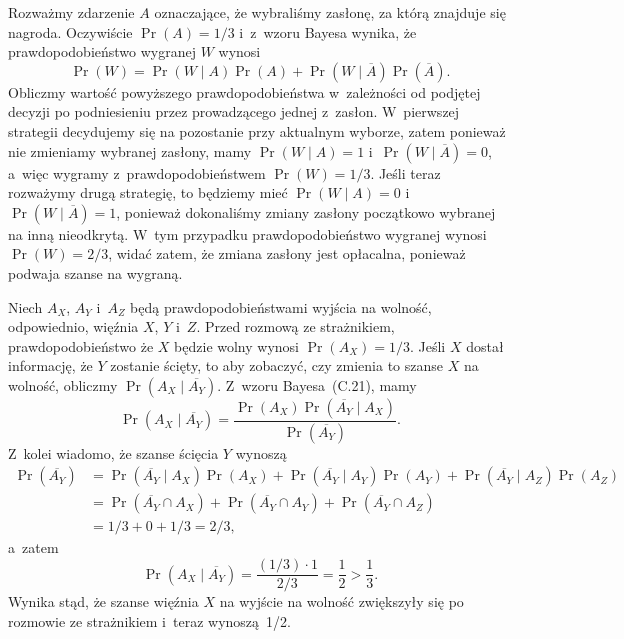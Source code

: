 \exercise{} %
Rozważmy zdarzenie $A$ oznaczające, że wybraliśmy zasłonę, za którą znajduje się nagroda. Oczywiście $\Pr(A)=1/3$ i~z~wzoru Bayesa wynika, że prawdopodobieństwo wygranej $W$ wynosi
\[
	\Pr(W) = \Pr(W\mid A)\Pr(A)+\Pr(W\mid\overline{A})\Pr(\overline{A}).
\]
Obliczmy wartość powyższego prawdopodobieństwa w~zależności od podjętej decyzji po podniesieniu przez prowadzącego jednej z~zasłon. W~pierwszej strategii decydujemy się na pozostanie przy aktualnym wyborze, zatem ponieważ nie zmieniamy wybranej zasłony, mamy $\Pr(W\mid A)=1$ i~$\Pr(W\mid\overline{A})=0$, a~więc wygramy z~prawdopodobieństwem $\Pr(W)=1/3$. Jeśli teraz rozważymy drugą strategię, to będziemy mieć $\Pr(W\mid A)=0$ i~$\Pr(W\mid\overline{A})=1$, ponieważ dokonaliśmy zmiany zasłony początkowo wybranej na inną nieodkrytą. W~tym przypadku prawdopodobieństwo wygranej wynosi $\Pr(W)=2/3$, widać zatem, że zmiana zasłony jest opłacalna, ponieważ podwaja szanse na wygraną.

\exercise{} %
Niech $A_X$, $A_Y$ i~$A_Z$ będą prawdopodobieństwami wyjścia na wolność, odpowiednio, więźnia $X$, $Y$ i~$Z$. Przed rozmową ze strażnikiem, prawdopodobieństwo że $X$ będzie wolny wynosi $\Pr(A_X)=1/3$. Jeśli $X$ dostał informację, że $Y$ zostanie ścięty, to aby zobaczyć, czy zmienia to szanse $X$ na wolność, obliczmy $\Pr(A_X\mid\overline{A_Y})$. Z~wzoru Bayesa~(C.21), mamy
\[
	\Pr(A_X\mid\overline{A_Y}) = \frac{\Pr(A_X)\Pr(\overline{A_Y}\mid A_X)}{\Pr(\overline{A_Y})}.
\]
Z~kolei wiadomo, że szanse ścięcia $Y$ wynoszą
\begin{align*}
	\Pr(\overline{A_Y}) &= \Pr(\overline{A_Y}\mid A_X)\Pr(A_X)+\Pr(\overline{A_Y}\mid A_Y)\Pr(A_Y)+\Pr(\overline{A_Y}\mid A_Z)\Pr(A_Z) \\
	&= \Pr(\overline{A_Y}\cap A_X)+\Pr(\overline{A_Y}\cap A_Y)+\Pr(\overline{A_Y}\cap A_Z) \\
	&= 1/3+0+1/3 = 2/3,
\end{align*}
a~zatem
\[
	\Pr(A_X\mid\overline{A_Y}) = \frac{(1/3)\cdot1}{2/3} = \frac{1}{2}>\frac{1}{3}.
\]
Wynika stąd, że szanse więźnia $X$ na wyjście na wolność zwiększyły się po rozmowie ze strażnikiem i~teraz wynoszą~1/2.


